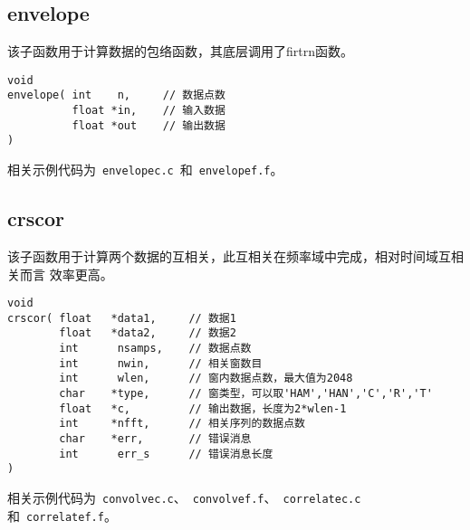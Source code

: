 \subsection{envelope}
该子函数用于计算数据的包络函数，其底层调用了firtrn函数。
\begin{lstlisting}[style=C]
void                                                                                
envelope( int    n,     // 数据点数
          float *in,    // 输入数据
          float *out    // 输出数据
)
\end{lstlisting}

相关示例代码为~\lstinline{envelopec.c}~和~\lstinline{envelopef.f}。

\subsection{crscor}
该子函数用于计算两个数据的互相关，此互相关在频率域中完成，相对时间域互相关而言
效率更高。

\begin{lstlisting}[style=C]
void                                                                                  
crscor( float   *data1,     // 数据1
        float   *data2,     // 数据2                                       
        int      nsamps,    // 数据点数                                               
        int      nwin,      // 相关窗数目                                            
        int      wlen,      // 窗内数据点数，最大值为2048                                          
        char    *type,      // 窗类型，可以取'HAM','HAN','C','R','T'
        float   *c,         // 输出数据，长度为2*wlen-1
        int     *nfft,      // 相关序列的数据点数                            
        char    *err,       // 错误消息                                  
        int      err_s      // 错误消息长度
)
\end{lstlisting}

相关示例代码为~\lstinline{convolvec.c}、~\lstinline{convolvef.f}、~\lstinline{correlatec.c}~
和~\lstinline{correlatef.f}。

